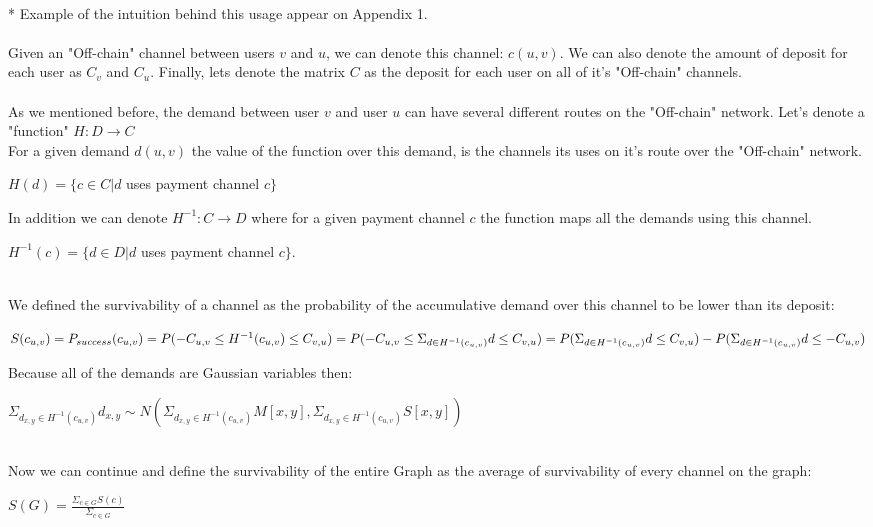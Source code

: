 \documentclass{cup-ino}
\begin{document}
\\
* Example of the intuition behind this usage appear on Appendix 1.
\\\\
Given an "Off-chain" channel between users $v$ and $u$, we can denote this channel: $c(u,v)$. We can also denote the amount of deposit for each user as $C_v$ and $C_u$.
Finally, lets denote the matrix $C$ as the deposit for each user on all of it's "Off-chain" channels.\\
\\
As we mentioned before, the demand between user $v$ and user $u$ can have several different routes on the "Off-chain" network. Let's denote a "function"
$H:D \rightarrow C$ \\
For a given demand $d(u,v)$ the value of the function over this demand, is the channels its uses on it's route over the "Off-chain" network.
\begin{center}
$H(d)=\{c \in C | d $ uses payment channel $c\}$\\
\end{center}
In addition we can denote $H^{-1}:C \rightarrow D$ where for a given payment channel $c$ the function maps all the demands using this channel.
\begin{center}
$H^{-1}(c)=\{d \in D | d$ uses payment channel $c\}$.\\
\end{center}
\\
We defined the survivability of a channel as the probability of the accumulative demand over this channel to be lower than its deposit:
\begin{center}
    $S(c_{u,v}) = P_{success}(c_{u,v}) = P(-C_{u,v} \leq H^{-1}(c_{u,v}) \leq C_{v,u}) = \\
    P(-C_{u,v} \leq \Sigma_{d \in H^{-1}(c_{u,v})} d \leq C_{v,u}) = \\ 
    P(\Sigma_{d \in H^{-1}(c_{u,v})} d \leq C_{v,u}) - P(\Sigma_{d \in H^{-1}(c_{u,v})} d \leq -C_{u,v})$
\end{center}
Because all of the demands are Gaussian variables then:
\begin{center}
    $\Sigma_{d_{x,y} \in H^{-1}(c_{u,v})} d_{x,y} \sim N(\Sigma_{d_{x,y} \in H^{-1}(c_{u,v})} M[x,y], \Sigma_{d_{x,y} \in H^{-1}(c_{u,v})} S[x,y])$
\end{center}
\\
Now we can continue and define the survivability of the entire Graph as the average of survivability of every channel on the graph:
\begin{center}
    $S(G) = \frac{\Sigma_{c \in G} S(c)}{\Sigma_{c \in G}}$
\end{center}
\end{document}
